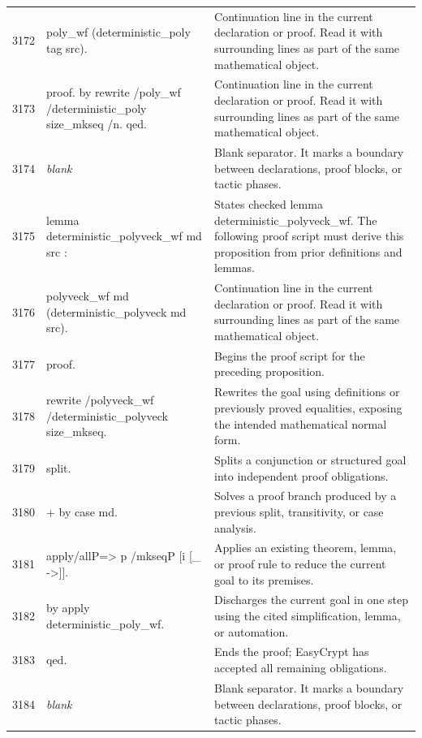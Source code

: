 \documentclass[10pt]{article}
\begin{document}
\begin{longtable}{r L{0.53\textwidth} L{0.37\textwidth}}
3172 & {\ttfamily\scriptsize   poly\_wf (deterministic\_poly tag src).} & Continuation line in the current declaration or proof.  Read it with surrounding lines as part of the same mathematical object. \\
3173 & {\ttfamily\scriptsize proof. by rewrite /poly\_wf /deterministic\_poly size\_mkseq /n. qed.} & Continuation line in the current declaration or proof.  Read it with surrounding lines as part of the same mathematical object. \\
3174 & {\ttfamily\scriptsize \emph{blank}} & Blank separator.  It marks a boundary between declarations, proof blocks, or tactic phases. \\
3175 & {\ttfamily\scriptsize lemma deterministic\_polyveck\_wf md src :} & States checked lemma deterministic\_polyveck\_wf.  The following proof script must derive this proposition from prior definitions and lemmas. \\
3176 & {\ttfamily\scriptsize   polyveck\_wf md (deterministic\_polyveck md src).} & Continuation line in the current declaration or proof.  Read it with surrounding lines as part of the same mathematical object. \\
3177 & {\ttfamily\scriptsize proof.} & Begins the proof script for the preceding proposition. \\
3178 & {\ttfamily\scriptsize rewrite /polyveck\_wf /deterministic\_polyveck size\_mkseq.} & Rewrites the goal using definitions or previously proved equalities, exposing the intended mathematical normal form. \\
3179 & {\ttfamily\scriptsize split.} & Splits a conjunction or structured goal into independent proof obligations. \\
3180 & {\ttfamily\scriptsize + by case md.} & Solves a proof branch produced by a previous split, transitivity, or case analysis. \\
3181 & {\ttfamily\scriptsize apply/allP=> p /mkseqP [i [\_ ->]].} & Applies an existing theorem, lemma, or proof rule to reduce the current goal to its premises. \\
3182 & {\ttfamily\scriptsize by apply deterministic\_poly\_wf.} & Discharges the current goal in one step using the cited simplification, lemma, or automation. \\
3183 & {\ttfamily\scriptsize qed.} & Ends the proof; EasyCrypt has accepted all remaining obligations. \\
3184 & {\ttfamily\scriptsize \emph{blank}} & Blank separator.  It marks a boundary between declarations, proof blocks, or tactic phases. \\

\end{longtable}
\end{document}
